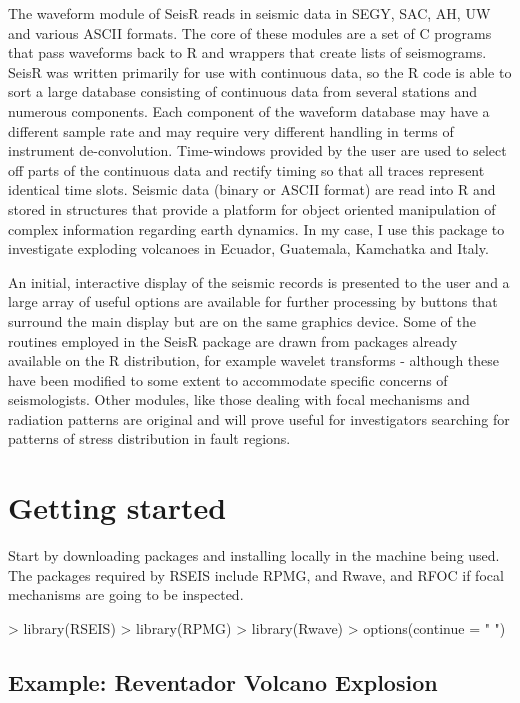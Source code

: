 \documentclass{article}
\begin{document}
The waveform module of SeisR reads in seismic data in SEGY, SAC, AH,
UW and various ASCII formats.  The core of these modules are a set of
C programs that pass waveforms back to R and wrappers that create
lists of seismograms.  SeisR was written primarily for use with
continuous data, so the R code is able to sort a large database
consisting of continuous data from several stations and numerous
components.  Each component of the waveform database may have a
different sample rate and may require very different handling in terms
of instrument de-convolution.  Time-windows provided by the user are
used to select off parts of the continuous data and rectify timing so
that all traces represent identical time slots.  Seismic data (binary
or ASCII format) are read into R and stored in structures that provide
a platform for object oriented manipulation of complex information
regarding earth dynamics.  In my case, I use this package to
investigate exploding volcanoes in Ecuador, Guatemala, Kamchatka and
Italy.

An initial, interactive display of the seismic records is presented to
the user and a large array of useful options are available for further
processing by buttons that surround the main display but are on the
same graphics device.  Some of the routines employed in the SeisR
package are drawn from packages already available on the R
distribution, for example wavelet transforms - although these have
been modified to some extent to accommodate specific concerns of
seismologists. Other modules, like those dealing with focal mechanisms
and radiation patterns are original and will prove useful for
investigators searching for patterns of stress distribution in fault
regions.  


\section{Getting started}

Start by downloading packages and installing locally in the
machine being used.
The packages required by RSEIS include RPMG, and Rwave, 
and RFOC if focal mechanisms are going to be inspected.

\begin{Schunk}
\begin{Sinput}
> library(RSEIS)
> library(RPMG)
> library(Rwave)
> options(continue = " ")
\end{Sinput}
\end{Schunk}

\subsection{Example: Reventador Volcano Explosion }
\end{document}
